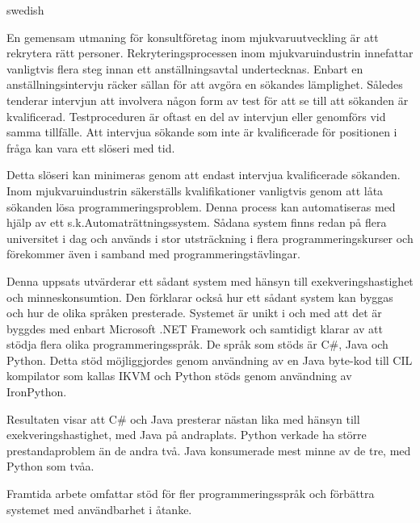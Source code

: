 \begin{foreignabstract}{swedish}

En gemensam utmaning för konsultföretag inom mjukvaruutveckling är att rekrytera rätt personer. Rekryteringsprocessen inom mjukvaruindustrin innefattar vanligtvis flera steg innan ett anställningsavtal undertecknas. Enbart en anställningsintervju räcker sällan för att avgöra en sökandes lämplighet. Således tenderar intervjun att involvera någon form av test för att se till att sökanden är kvalificerad. Testproceduren är oftast en del av intervjun eller genomförs vid samma tillfälle. Att intervjua sökande som inte är kvalificerade för positionen i fråga kan vara ett slöseri med tid.

Detta slöseri kan minimeras genom att endast intervjua kvalificerade sökanden. Inom mjukvaruindustrin säkerställs kvalifikationer vanligtvis genom att låta sökanden lösa programmeringsproblem. Denna process kan automatiseras med hjälp av ett s.k.Automaträttningssystem. Sådana system finns redan på flera universitet i dag och används i stor utsträckning i flera programmeringskurser och förekommer även i samband med programmeringstävlingar.

Denna uppsats utvärderar ett sådant system med hänsyn till exekveringshastighet och minneskonsumtion. Den förklarar också hur ett sådant system kan byggas och hur de olika språken presterade. Systemet är unikt i och med att det är byggdes med enbart Microsoft .NET Framework och samtidigt klarar av att stödja flera olika programmeringsspråk. De språk som stöds är C\#, Java och Python. Detta stöd möjliggjordes genom användning av en Java byte-kod till CIL kompilator som kallas IKVM och Python stöds genom användning av IronPython.

Resultaten visar att C\# och Java presterar nästan lika med hänsyn till exekveringshastighet, med Java på andraplats. Python verkade ha större prestandaproblem än de andra två. Java konsumerade mest minne av de tre, med Python som tvåa.

Framtida arbete omfattar stöd för fler programmeringsspråk och förbättra systemet med användbarhet i åtanke.

\end{foreignabstract}